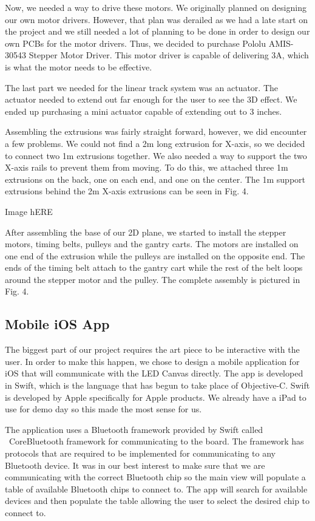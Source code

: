 \documentclass[12pt]{article}
\begin{document}
Now, we needed a way to drive these motors. We originally planned on designing our own motor drivers. However, that plan was derailed as we had a late start on the project and we still needed a lot of planning to be done in order to design our own PCBs for the motor drivers. Thus, we decided to purchase Pololu AMIS-30543 Stepper Motor Driver. This motor driver is capable of delivering 3A, which is what the motor needs to be effective. 

The last part we needed for the linear track system was an actuator. The actuator needed to extend out far enough for the user to see the 3D effect. We ended up purchasing a mini actuator capable of extending out to 3 inches. 

Assembling the extrusions was fairly straight forward, however, we did encounter a few problems. We could not find a 2m long extrusion for X-axis, so we decided to connect two 1m extrusions together. We also needed a way to support the two X-axis rails to prevent them from moving. To do this, we attached three 1m extrusions on the back, one on each end, and one on the center. The 1m support extrusions behind the 2m X-axis extrusions can be seen in Fig. 4.

Image hERE

After assembling the base of our 2D plane, we started to install the stepper motors, timing belts, pulleys and the gantry carts. The motors are installed on one end of the extrusion while the pulleys are installed on the opposite end. The ends of the timing belt attach to the gantry cart while the rest of the belt loops around the stepper motor and the pulley. The complete assembly is pictured in Fig. 4.

\subsection{Mobile iOS App}
The biggest part of our project requires the art piece to be interactive with the user. In order to make this happen, we chose to design a mobile application for iOS that will communicate with the LED Canvas directly. The app is developed in Swift, which is the language that has begun to take place of Objective-C. Swift is developed by Apple specifically for Apple products. We already have a iPad to use for demo day so this made the most sense for us.

The application uses a Bluetooth framework provided by Swift called  CoreBluetooth framework for communicating to the board. The framework has protocols that are required to be implemented for communicating to any Bluetooth device. It was in our best interest to make sure that we are communicating with the correct Bluetooth chip so the main view will populate a table of available Bluetooth chips to connect to. The app will search for available devices and then populate the table allowing the user to select the desired chip to connect to.  
\end{document}
